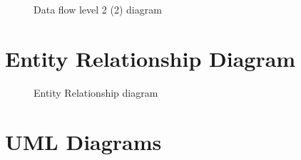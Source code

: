 \documentclass[oneside,a4paper,12pt]{report}
\begin{document}
        \begin{center}
        	\begin{figure}[!hp]
        		\centering
        	  \caption{Data flow level 2 (2) diagram}
        	  \label{fig:Data flow level 2}
        	\end{figure}
        \end{center}
    
     \pagebreak
    \section{Entity Relationship Diagram}
        \begin{center}
        	\begin{figure}[!hp]
        		\centering
        	  \caption{Entity Relationship diagram}
        	  \label{fig:Entity Relationship}
        	\end{figure}
        \end{center}
        
     \pagebreak
    \section{UML Diagrams}
    
\end{document}
